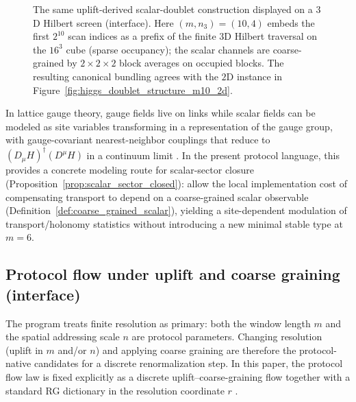 \begin{figure}[t]
\centering
{}
\caption{The same uplift-derived scalar-doublet construction displayed on a $3$D Hilbert screen (interface). Here $(m,n_3)=(10,4)$ embeds the first $2^{10}$ scan indices as a prefix of the finite $3$D Hilbert traversal on the $16^3$ cube (sparse occupancy); the scalar channels are coarse-grained by $2\times 2\times 2$ block averages on occupied blocks. The resulting canonical bundling agrees with the $2$D instance in Figure~\ref{fig:higgs_doublet_structure_m10_2d}.}
\label{fig:higgs_doublet_structure_m10_3d}
\end{figure}

\begin{remark}
In lattice gauge theory, gauge fields live on links while scalar fields can be modeled as site variables transforming in a representation of the gauge group, with gauge-covariant nearest-neighbor couplings that reduce to $(D_\mu H)^\dagger(D^\mu H)$ in a continuum limit \cite{Wilson1974,KogutSusskind1975HamiltonianLGT,Rothe2012}.
In the present protocol language, this provides a concrete modeling route for scalar-sector closure (Proposition~\ref{prop:scalar_sector_closed}): allow the local implementation cost of compensating transport to depend on a coarse-grained scalar observable (Definition~\ref{def:coarse_grained_scalar}), yielding a site-dependent modulation of transport/holonomy statistics without introducing a new minimal stable type at $m=6$.
\end{remark}

\subsection{Protocol flow under uplift and coarse graining (interface)}
\label{subsec:protocol_flow_interface}

The program treats finite resolution as primary: both the window length $m$ and the spatial addressing scale $n$ are protocol parameters.
Changing resolution (uplift in $m$ and/or $n$) and applying coarse graining are therefore the protocol-native candidates for a discrete renormalization step.
In this paper, the protocol flow law is fixed explicitly as a discrete uplift--coarse-graining flow together with a standard RG dictionary in the resolution coordinate $r$ \cite{Wilson1974,Rothe2012}.


